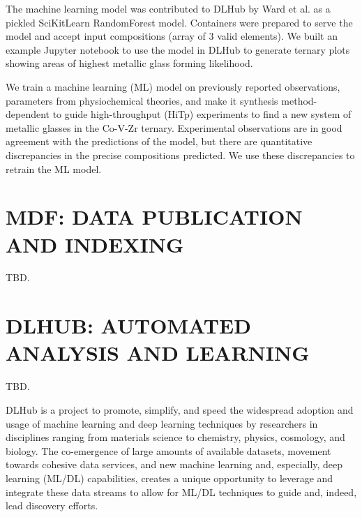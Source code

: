 \documentclass{aip-cp}
\newcommand\ben[1]{}
\newcommand\ben[1]{{\color{blue}[Ben: #1]}}
\begin{document}
The machine learning model was contributed to DLHub by Ward et al. as a
pickled SciKitLearn RandomForest model. Containers were prepared to serve the
model and accept input compositions (array of 3 valid elements). We built an
example Jupyter notebook  to use the model in DLHub to generate ternary plots
showing areas of highest metallic glass forming likelihood.

\ben{cite https://github.com/fang-ren/~\cite{FangRen}}

We train a machine learning (ML) model on previously reported observations,
parameters from physiochemical theories, and make it synthesis
method-dependent to guide high-throughput (HiTp) experiments to find a new
system of metallic glasses in the Co-V-Zr ternary. Experimental observations
are in good agreement with the predictions of the model, but there are
quantitative discrepancies in the precise compositions predicted. We use these
discrepancies to retrain the ML model.

\ben{cite Ward et al (BMG Nature)~\cite{ward2016general}}


\ben{Add DLHub usage details here}

\ben{Other potential models to highlight, CANDLE Benchmarks,
Segmentation of Tomographic Reconstruction of Connectomes in Mouse Brains}


\section{MDF: DATA PUBLICATION AND INDEXING}

TBD.


\section{DLHUB: AUTOMATED ANALYSIS AND LEARNING}

TBD.

DLHub is a project to promote, simplify, and speed the widespread adoption and usage of machine learning and deep learning techniques by researchers in disciplines ranging from materials science to chemistry, physics, cosmology, and biology. The co-emergence of large amounts of available datasets, movement towards cohesive data services, and new machine learning and, especially, deep learning (ML/DL) capabilities, creates a unique opportunity to leverage and integrate these data streams to allow for ML/DL techniques to guide and, indeed, lead discovery efforts.
 
\end{document}
